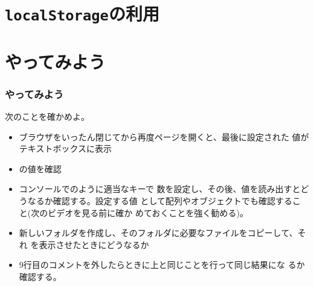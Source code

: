 \section{\texttt{localStorage}の利用}
\section{やってみよう}
\begin{frame}[containsverbatim]
\frametitle{やってみよう}
次のことを確かめよ。
\begin{itemize}
 \item ブラウザをいったん閉じてから再度ページを開くと、最後に設定された
       値がテキストボックスに表示
 \item {}の値を確認
 \item コンソールでのように適当なキーで
       数を設定し、その後、値を読み出すとどうなるか確認する。設定する値
       として配列やオブジェクトでも確認すること(次のビデオを見る前に確か
       めておくことを強く勧める)。
 \item 新しいフォルダを作成し、そのフォルダに必要なファイルをコピーして、それ
       を表示させたときにどうなるか
 \item 9行目のコメントを外したらときに上と同じことを行って同じ結果にな
       るか確認する。
\end{itemize} 
\end{frame}
 
\begin{frame}[containsverbatim]
\frametitle{}
\end{frame}
